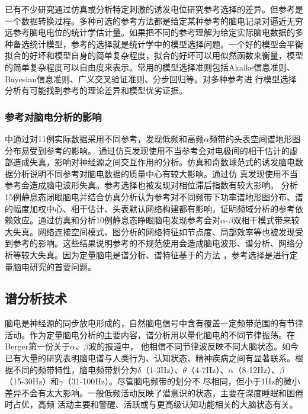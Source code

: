 已有不少研究通过仿真或分析特定刺激的诱发电位研究参考选择的差异。但参考是一个数据转换过程。多种可选的参考方法都是给定某种参考的脑电记录对逼近无穷远参考脑电电位的统计学估计量。如果把不同的参考理解为给定实际脑电数据的多种备选统计模型，参考的选择就是统计学中的模型选择问题。一个好的模型会平衡拟合的好坏和模型自身的简单复杂程度，拟合的好坏可以用似然函数来衡量，模型的简单复杂程度可以自由度来表示。常用的模型选择准则包括Akaike信息准则、Bayesian信息准则、广义交叉验证准则、分步回归等。对多种参考进
行模型选择分析有可能找到参考的理论差异和模型优劣证据。

\subsubsection{参考对脑电分析的影响}
\cite{yao_d_comparative_2005}中通过对11例实际数据采用不同参考，发现低频和高频$\alpha$频带的头表空间谱地形图分布易受到参考的影响。
\cite{marzetti_l_use_2007}通过仿真发现使用不当参考会对电极间的相干估计的虚部造成失真，影响对神经源之间交互作用的分析。仿真和奇数球范式的诱发脑电数据分析说明不同参考对脑电数据的质量中心有较大影响。\cite{liu_q_estimating_2015}通过仿
真发现使用不当参考会造成脑电波形失真。参考选择也被发现对相位滞后指数有较大影响。
\cite{qin_comparative_2010}分析15例静息态闭眼脑电并结合仿真分析认为参考对不同频带下功率谱地形图分布、谱的幅度加权中心、相干估计、头表默认网络构建都有影响，证明频域分析的参考依赖效应。\cite{chella_f_non-linear_2017}通过仿真和分析10例静息态睁眼脑电发现参考会对$\alpha$-$\beta$双相干模式带来较大失真。网络连接空间模式、图分析的网络特征如节点度、局部效率等也被发现受到参考的影响。这些结果说明参考的不规范使用会造成脑电波形、谱分析、网络分析等较大失真。因为定量脑电是谱分析、谱特征基于的方法
，参考选择是进行定量脑电研究的首要问题。

\subsection{谱分析技术}
脑电是神经源的同步放电形成的，自然脑电信号中含有覆盖一定频带范围的有节律活动。作为定量脑电分析的主要内容，谱分析用以量化脑电的不同节律振荡。在Berger第一份关于$\alpha$、$\beta$波的报道中，
他相信不同节律波反映不同大脑状态。如今已有大量的研究表明脑电谱与人类行为、认知状态、精神疾病之间有显著联系。根据不同的频带特性，脑电频带划分为$\delta$（1-3Hz）、$\theta$（4-7Hz）、$\alpha$（8-12Hz）、$\beta$（15-30Hz）和$\gamma$（31-100Hz）。尽管脑电频带的划分不
尽相同，但小于1Hz的微小差异不会有太大影响。一般低频活动反映了潜意识的状态，主要在深度睡眠和困倦时占优，高频
活动主要和警醒、活跃或与更高级认知功能相关的大脑状态有关。

